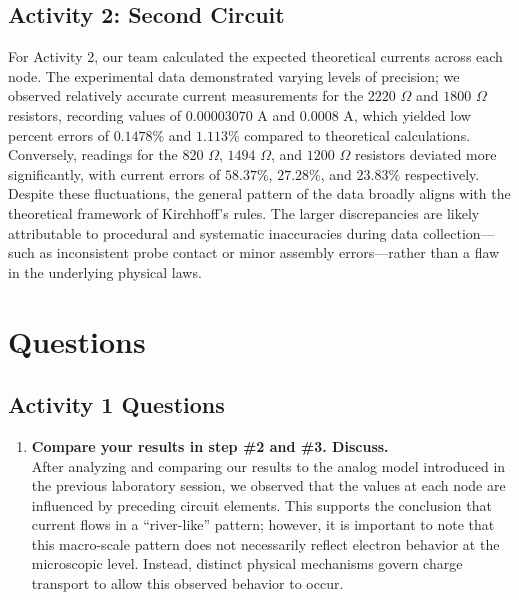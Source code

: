 \documentclass[12pt]{article}
\begin{document}
\subsection*{Activity 2: Second Circuit}
For Activity 2, our team calculated the expected theoretical currents across
each node. The experimental data demonstrated varying levels of precision; we
observed relatively accurate current measurements for the $2220$ $\Omega$
and $1800$ $\Omega$ resistors, recording values of $0.00003070$ A and $0.0008$
A, which yielded low percent errors of $0.1478\%$ and $1.113\%$ compared to
theoretical calculations. Conversely, readings for
the $820$ $\Omega$, $1494$ $\Omega$, and $1200$ $\Omega$ resistors deviated more
significantly, with current errors of $58.37\%$, $27.28\%$, and $23.83\%$
respectively. Despite these fluctuations, the general pattern of the data
broadly aligns with the theoretical framework of Kirchhoff's rules. The larger
discrepancies are likely attributable to procedural and systematic inaccuracies
during data collection—such as inconsistent probe contact or minor assembly
errors—rather than a flaw in the underlying physical laws.

\section{Questions}
\subsection*{Activity 1 Questions}
\begin{enumerate}
  \item \textbf{Compare your results in step \#2 and \#3. Discuss.} \\
        After analyzing and comparing our results to the analog model introduced
        in the previous laboratory session, we observed that the values at each
        node are influenced by preceding circuit elements. This supports the
        conclusion that current flows in a ``river-like'' pattern; however, it
        is important to note that this macro-scale pattern does not necessarily
        reflect electron behavior at the microscopic level. Instead, distinct
        physical mechanisms govern charge transport to allow this observed
        behavior to occur.
\end{enumerate}
\end{document}

